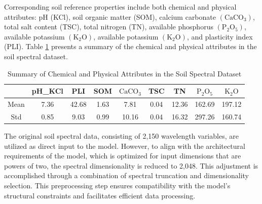 \documentclass[10pt, a4paper, oneside]{article}
\begin{document}
Corresponding soil reference properties include both chemical and physical attributes: pH (KCl), soil organic matter (SOM), calcium carbonate \( (\text{CaCO}_3) \), total salt content (TSC), total nitrogen (TN), available phosphorus \( (\text{P}_2\text{O}_5) \), available potassium \( (\text{K}_2\text{O}) \), available potassium \((\text{K}_2\text{O})\), and plasticity index (PLI). Table \ref{tab:table6} presents a summary of the chemical and physical attributes in the soil spectral dataset.

\begin{table}[!h]
\centering
\begin{tabular}{ccccccccc}
\hline
& pH\_KCl & PLI & SOM & \(\text{CaCO}_3\) & TSC & TN & \(\text{P}_2\text{O}_5\) & \(\text{K}_2\text{O}\) \\
\hline
Mean & 7.36 & 42.68 & 1.63 & 7.81 & 0.04 & 12.36 & 162.69 & 197.12 \\
Std & 0.85 & 9.03 & 0.99 & 10.16 & 0.04 & 16.32 & 297.26 & 160.74 \\
\hline
\end{tabular}
\caption{Summary of Chemical and Physical Attributes in the Soil Spectral Dataset}\label{tab:table6}
\end{table}

The original soil spectral data, consisting of 2,150 wavelength variables, are utilized as direct input to the model. However, to align with the architectural requirements of the model, which is optimized for input dimensions that are powers of two, the spectral dimensionality is reduced to 2,048. This adjustment is accomplished through a combination of spectral truncation and dimensionality selection. This preprocessing step ensures compatibility with the model’s structural constraints and facilitates efficient data processing.
\end{document}
